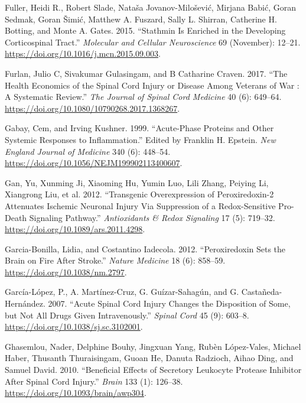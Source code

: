\documentclass[9pt,lineno]{elife}
\newlength{\cslhangindent}
\newlength{\cslentryspacingunit} %
\newenvironment{CSLReferences}[2] %
 {%
  \setlength{\parindent}{0pt}
  \ifodd #1
  \let\oldpar\par
  \def\par{\hangindent=\cslhangindent\oldpar}
  \fi
  \setlength{\parskip}{#2\cslentryspacingunit}
 }%
 {}
\begin{document}
\begin{landscape}
\begin{landscape}
\begin{landscape}
\begin{landscape}
\begin{CSLReferences}{1}{0}
\leavevmode{}%
Fuller, Heidi R., Robert Slade, Nataša Jovanov-Milošević, Mirjana Babić, Goran Sedmak, Goran Šimić, Matthew A. Fuszard, Sally L. Shirran, Catherine H. Botting, and Monte A. Gates. 2015. {``Stathmin Is Enriched in the Developing Corticospinal Tract.''} \emph{Molecular and Cellular Neuroscience} 69 (November): 12--21. \url{https://doi.org/10.1016/j.mcn.2015.09.003}.

\leavevmode{}%
Furlan, Julio C, Sivakumar Gulasingam, and B Catharine Craven. 2017. {``The {Health Economics} of the Spinal Cord Injury or Disease Among Veterans of War : {A} Systematic Review.''} \emph{The Journal of Spinal Cord Medicine} 40 (6): 649--64. \url{https://doi.org/10.1080/10790268.2017.1368267}.

\leavevmode{}%
Gabay, Cem, and Irving Kushner. 1999. {``Acute-{Phase Proteins} and {Other Systemic Responses} to {Inflammation}.''} Edited by Franklin H. Epstein. \emph{New England Journal of Medicine} 340 (6): 448--54. \url{https://doi.org/10.1056/NEJM199902113400607}.

\leavevmode{}%
Gan, Yu, Xunming Ji, Xiaoming Hu, Yumin Luo, Lili Zhang, Peiying Li, Xiangrong Liu, et al. 2012. {``Transgenic {Overexpression} of {Peroxiredoxin-2 Attenuates Ischemic Neuronal Injury Via Suppression} of a {Redox-Sensitive Pro-Death Signaling Pathway}.''} \emph{Antioxidants \& Redox Signaling} 17 (5): 719--32. \url{https://doi.org/10.1089/ars.2011.4298}.

\leavevmode{}%
Garcia-Bonilla, Lidia, and Costantino Iadecola. 2012. {``Peroxiredoxin Sets the Brain on Fire After Stroke.''} \emph{Nature Medicine} 18 (6): 858--59. \url{https://doi.org/10.1038/nm.2797}.

\leavevmode{}%
García-López, P., A. Martínez-Cruz, G. Guízar-Sahagún, and G. Castañeda-Hernández. 2007. {``Acute Spinal Cord Injury Changes the Disposition of Some, but Not All Drugs Given Intravenously.''} \emph{Spinal Cord} 45 (9): 603--8. \url{https://doi.org/10.1038/sj.sc.3102001}.

\leavevmode{}%
Ghasemlou, Nader, Delphine Bouhy, Jingxuan Yang, Rubèn López-Vales, Michael Haber, Thusanth Thuraisingam, Guoan He, Danuta Radzioch, Aihao Ding, and Samuel David. 2010. {``Beneficial Effects of Secretory Leukocyte Protease Inhibitor After Spinal Cord Injury.''} \emph{Brain} 133 (1): 126--38. \url{https://doi.org/10.1093/brain/awp304}.


\end{CSLReferences}
\end{landscape}
\end{landscape}
\end{landscape}
\end{landscape}
\end{document}

